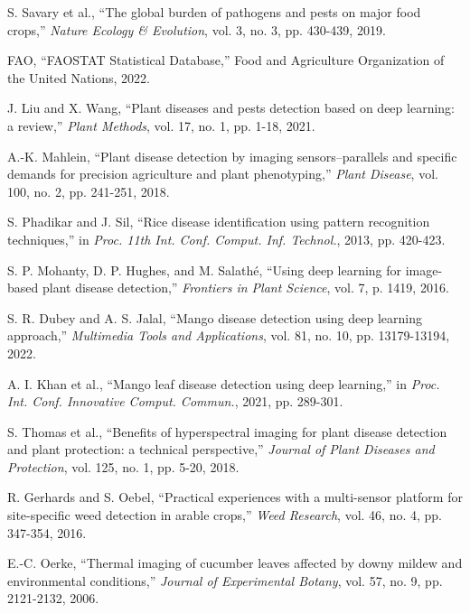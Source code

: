 \documentclass[conference]{IEEEtran}
\begin{document}
\begin{thebibliography}{00}
 S. Savary et al., ``The global burden of pathogens and pests on major food crops,'' \textit{Nature Ecology \& Evolution}, vol. 3, no. 3, pp. 430-439, 2019.

 FAO, ``FAOSTAT Statistical Database,'' Food and Agriculture Organization of the United Nations, 2022.

 J. Liu and X. Wang, ``Plant diseases and pests detection based on deep learning: a review,'' \textit{Plant Methods}, vol. 17, no. 1, pp. 1-18, 2021.

 A.-K. Mahlein, ``Plant disease detection by imaging sensors–parallels and specific demands for precision agriculture and plant phenotyping,'' \textit{Plant Disease}, vol. 100, no. 2, pp. 241-251, 2018.

 S. Phadikar and J. Sil, ``Rice disease identification using pattern recognition techniques,'' in \textit{Proc. 11th Int. Conf. Comput. Inf. Technol.}, 2013, pp. 420-423.

 S. P. Mohanty, D. P. Hughes, and M. Salathé, ``Using deep learning for image-based plant disease detection,'' \textit{Frontiers in Plant Science}, vol. 7, p. 1419, 2016.

 S. R. Dubey and A. S. Jalal, ``Mango disease detection using deep learning approach,'' \textit{Multimedia Tools and Applications}, vol. 81, no. 10, pp. 13179-13194, 2022.

 A. I. Khan et al., ``Mango leaf disease detection using deep learning,'' in \textit{Proc. Int. Conf. Innovative Comput. Commun.}, 2021, pp. 289-301.

 S. Thomas et al., ``Benefits of hyperspectral imaging for plant disease detection and plant protection: a technical perspective,'' \textit{Journal of Plant Diseases and Protection}, vol. 125, no. 1, pp. 5-20, 2018.

 R. Gerhards and S. Oebel, ``Practical experiences with a multi-sensor platform for site-specific weed detection in arable crops,'' \textit{Weed Research}, vol. 46, no. 4, pp. 347-354, 2016.

 E.-C. Oerke, ``Thermal imaging of cucumber leaves affected by downy mildew and environmental conditions,'' \textit{Journal of Experimental Botany}, vol. 57, no. 9, pp. 2121-2132, 2006.


\end{thebibliography}
\end{document}

